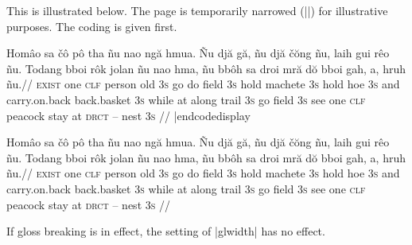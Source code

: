 This is illustrated below.  The page is temporarily narrowed
(|\hsize=2.5in|) for illustrative purposes.  The coding is given
first.


\codedisplay
\ex
\hsize=2.5in
\let\\=\textsc
\begingl[glhangindent=0pt,glbreaking=true]
\gla Hom\^{a}o sa \v{c}\^{o} p\^{o} tha  \~{n}u nao ng\u{a}
hmua. \~{N}u dj\u{a} g\u{a}, \~{n}u dj\u{a} \v{c}\u{o}ng \~{n}u,
laih gui r\^{e}o \~{n}u. Todang bboi r\^{o}k jolan \~{n}u nao
hma, \~{n}u bb\^{o}h sa droi mr\u{a} d\u{o} bboi gah, a, hruh
\~{n}u.//
\glb \\{exist} one \\{clf} person old \\{3s} go do field
\\{3s} hold machete \\{3s} hold hoe \\{3s} and carry.on.back
back.basket \\{3s} while at along trail \\{3s} go field \\{3s}
see one \\{clf} peacock stay at \\{drct} -- nest \\{3s}
//
\endgl
\xe
|endcodedisplay

\ex
\hsize=2.5in
\let\\=\textsc
\begingl[glhangindent=0pt,glbreaking=true]
\gla Hom\^{a}o sa \v{c}\^{o} p\^{o} tha  \~{n}u nao ng\u{a}
hmua. \~{N}u dj\u{a} g\u{a}, \~{n}u dj\u{a} \v{c}\u{o}ng \~{n}u,
laih gui r\^{e}o \~{n}u. Todang bboi r\^{o}k jolan \~{n}u nao
hma, \~{n}u bb\^{o}h sa droi mr\u{a} d\u{o} bboi gah, a, hruh
\~{n}u.//
\glb \\{exist} one \\{clf} person old \\{3s} go do field
\\{3s} hold machete \\{3s} hold hoe \\{3s} and carry.on.back
back.basket \\{3s} while at along trail \\{3s} go field \\{3s}
see one \\{clf} peacock stay at \\{drct} -- nest \\{3s}
//
\endgl
\xe


If gloss breaking is in effect, the setting of |glwidth| has no
effect.



